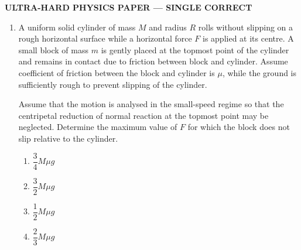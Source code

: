\documentclass[12pt]{article}
\begin{document}
\begin{center}
\Large \textbf{ULTRA-HARD PHYSICS PAPER — SINGLE CORRECT}
\end{center}

\begin{enumerate}



\item
A uniform solid cylinder of mass $M$ and radius $R$ rolls without slipping on a rough horizontal surface while a horizontal force $F$ is applied at its centre. A small block of mass $m$ is gently placed at the topmost point of the cylinder and remains in contact due to friction between block and cylinder. Assume coefficient of friction between the block and cylinder is $\mu$, while the ground is sufficiently rough to prevent slipping of the cylinder. 

Assume that the motion is analysed in the small-speed regime so that the centripetal reduction of normal reaction at the topmost point may be neglected. Determine the maximum value of $F$ for which the block does not slip relative to the cylinder.

\begin{center}
\end{center}

\begin{enumerate}[label=\Alph*)]
\item $\dfrac{3}{4}M\mu g$
\item $\dfrac{3}{2}M\mu g$
\item $\dfrac{1}{2}M\mu g$
\item $\dfrac{2}{3}M\mu g$
\end{enumerate}


\end{enumerate}
\end{document}

